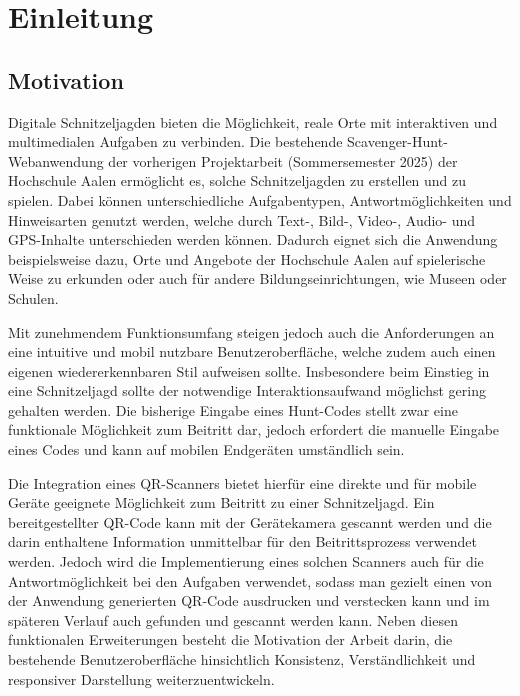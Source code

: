 ﻿\documentclass[oneside]{ausarbeitung}
\begin{document}
\cleardoublepage
{}
\setcounter{page}{1}

\chapter{Einleitung}
\label{cha:einleitung}


\section{Motivation}
\label{sec:motivation}

Digitale Schnitzeljagden bieten die Möglichkeit, reale Orte mit interaktiven und multimedialen Aufgaben zu verbinden.
Die bestehende Scavenger-Hunt-Webanwendung der vorherigen Projektarbeit (Sommersemester 2025) der Hochschule Aalen ermöglicht es,
solche Schnitzeljagden zu erstellen und zu spielen. Dabei können unterschiedliche Aufgabentypen, Antwortmöglichkeiten und Hinweisarten
genutzt werden, welche durch Text-, Bild-, Video-, Audio- und GPS-Inhalte unterschieden werden können.
Dadurch eignet sich die Anwendung beispielsweise dazu, Orte und Angebote der Hochschule Aalen auf spielerische Weise zu erkunden oder
auch für andere Bildungseinrichtungen, wie Museen oder Schulen.

Mit zunehmendem Funktionsumfang steigen jedoch auch die Anforderungen an eine intuitive und mobil nutzbare Benutzeroberfläche, welche 
zudem auch einen eigenen wiedererkennbaren Stil aufweisen sollte. Insbesondere beim Einstieg in eine Schnitzeljagd sollte der notwendige
Interaktionsaufwand möglichst gering gehalten werden. Die bisherige Eingabe eines Hunt-Codes stellt zwar eine funktionale Möglichkeit 
zum Beitritt dar, jedoch erfordert die manuelle Eingabe eines Codes und kann auf mobilen Endgeräten umständlich sein.

Die Integration eines QR-Scanners bietet hierfür eine direkte und für mobile Geräte geeignete Möglichkeit zum Beitritt zu einer Schnitzeljagd.
Ein bereitgestellter QR-Code kann mit der Gerätekamera gescannt werden und die darin enthaltene Information unmittelbar für den Beitrittsprozess
verwendet werden. Jedoch wird die Implementierung eines solchen Scanners auch für die Antwortmöglichkeit bei den Aufgaben verwendet, sodass man
gezielt einen von der Anwendung generierten QR-Code ausdrucken und verstecken kann und im späteren Verlauf auch gefunden und gescannt werden kann.
Neben diesen funktionalen Erweiterungen besteht die Motivation der Arbeit darin, die bestehende Benutzeroberfläche hinsichtlich Konsistenz, 
Verständlichkeit und responsiver Darstellung weiterzuentwickeln.
\end{document}
